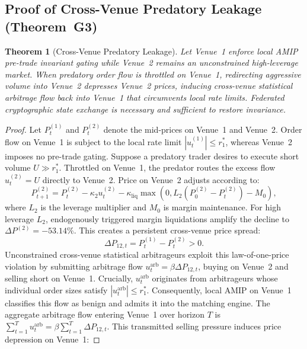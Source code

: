 \documentclass[11pt,a4paper]{article}
\newtheorem{theorem}{Theorem}[section]
\theoremstyle{definition}\newtheorem{definition}[theorem]{Definition}
\theoremstyle{remark}\newtheorem{remark}[theorem]{Remark}
\begin{document}
\subsection{Proof of Cross-Venue Predatory Leakage (Theorem~G3)}
\label{sec:supp_proof_g3}
\begin{theorem}[Cross-Venue Predatory Leakage]\label{thm:supp_g3}
Let Venue~1 enforce local AMIP pre-trade invariant gating while Venue~2 remains an unconstrained high-leverage market. When predatory order flow is throttled on Venue~1, redirecting aggressive volume into Venue~2 depresses Venue~2 prices, inducing cross-venue statistical arbitrage flow back into Venue~1 that circumvents local rate limits. Federated cryptographic state exchange is necessary and sufficient to restore invariance.
\end{theorem}
\begin{proof}
Let $P_t^{(1)}$ and $P_t^{(2)}$ denote the mid-prices on Venue~1 and Venue~2. Order flow on Venue~1 is subject to the local rate limit $|u_t^{(1)}| \le r_1^*$, whereas Venue~2 imposes no pre-trade gating.
Suppose a predatory trader desires to execute short volume $U \gg r_1^*$. Throttled on Venue~1, the predator routes the excess flow $u_t^{(2)} = U$ directly to Venue~2.
Price on Venue~2 adjusts according to:
\begin{equation}
P_{t+1}^{(2)} = P_t^{(2)} - \kappa_2 u_t^{(2)} - \kappa_{\text{liq}} \max\left(0, L_2 (P_0^{(2)} - P_t^{(2)}) - M_0\right),
\end{equation}
where $L_2$ is the leverage multiplier and $M_0$ is margin maintenance. For high leverage $L_2$, endogenously triggered margin liquidations amplify the decline to $\Delta P^{(2)} = -53.14\%$.
This creates a persistent cross-venue price spread:
\begin{equation}
\Delta P_{12, t} = P_t^{(1)} - P_t^{(2)} > 0.
\end{equation}
Unconstrained cross-venue statistical arbitrageurs exploit this law-of-one-price violation by submitting arbitrage flow $u_t^{\text{arb}} = \beta \Delta P_{12, t}$, buying on Venue~2 and selling short on Venue~1.
Crucially, $u_t^{\text{arb}}$ originates from arbitrageurs whose individual order sizes satisfy $|u_t^{\text{arb}}| \le r_1^*$. Consequently, local AMIP on Venue~1 classifies this flow as benign and admits it into the matching engine.
The aggregate arbitrage flow entering Venue~1 over horizon $T$ is $\sum_{t=1}^T u_t^{\text{arb}} = \beta \sum_{t=1}^T \Delta P_{12, t}$.
This transmitted selling pressure induces price depression on Venue~1:

\end{proof}
\end{document}
